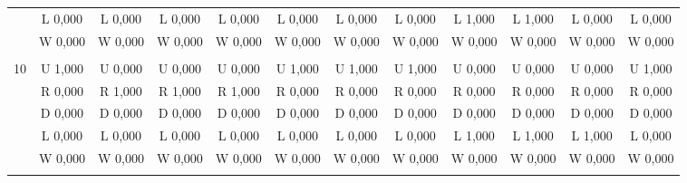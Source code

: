 \begin{table}[htbp]
\begin{footnotesize}
\begin{tabular}{c|c|c|c|c|c|c|c|c|c|c|c|}
&L 0,000&L 0,000&L 0,000&L 0,000&L 0,000&L 0,000&L 0,000&L 1,000&L 1,000&L 0,000&L 0,000\\
&W 0,000&W 0,000&W 0,000&W 0,000&W 0,000&W 0,000&W 0,000&W 0,000&W 0,000&W 0,000&W 0,000\\
\hline \\
10&U 1,000&U 0,000&U 0,000&U 0,000&U 1,000&U 1,000&U 1,000&U 0,000&U 0,000&U 0,000&U 1,000\\
&R 0,000&R 1,000&R 1,000&R 1,000&R 0,000&R 0,000&R 0,000&R 0,000&R 0,000&R 0,000&R 0,000\\
&D 0,000&D 0,000&D 0,000&D 0,000&D 0,000&D 0,000&D 0,000&D 0,000&D 0,000&D 0,000&D 0,000\\
&L 0,000&L 0,000&L 0,000&L 0,000&L 0,000&L 0,000&L 0,000&L 1,000&L 1,000&L 1,000&L 0,000\\
&W 0,000&W 0,000&W 0,000&W 0,000&W 0,000&W 0,000&W 0,000&W 0,000&W 0,000&W 0,000&W 0,000\\
\hline \\
\end{tabular}
\end{footnotesize}
\end{table}


